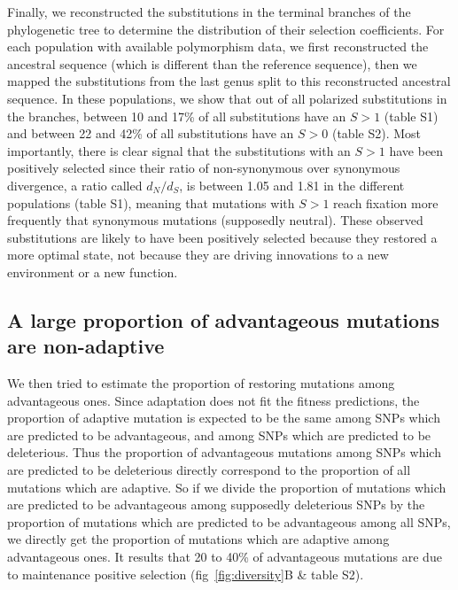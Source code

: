 \documentclass{article}
\newcommand{\dn}{d_N}
\newcommand{\ds}{d_S}
\newcommand{\dnds}{\dn / \ds}
\newcommand{\Sphy}{S}
\begin{document}
    Finally, we reconstructed the substitutions in the terminal branches of the phylogenetic tree to determine the distribution of their selection coefficients.
    For each population with available polymorphism data, we first reconstructed the ancestral sequence (which is different than the reference sequence), then we mapped the substitutions from the last genus split to this reconstructed ancestral sequence.
    In these populations, we show that out of all polarized substitutions in the branches, between 10 and 17\% of all substitutions have an $\Sphy > 1$ (table S1) and between 22 and 42\% of all substitutions have an $\Sphy > 0$ (table S2).
    Most importantly, there is clear signal that the substitutions with an $\Sphy > 1$ have been positively selected since their ratio of non-synonymous over synonymous divergence, a ratio called $\dnds$, is between 1.05 and 1.81 in the different populations (table S1), meaning that mutations with $\Sphy > 1$ reach fixation more frequently that synonymous mutations (supposedly neutral).
    These observed substitutions are likely to have been positively selected because they restored a more optimal state, not because they are driving innovations to a new environment or a new function.

    \subsection*{A large proportion of advantageous mutations are non-adaptive}

    We then tried to estimate the proportion of restoring mutations among advantageous ones.
    Since adaptation does not fit the fitness predictions, the proportion of adaptive mutation is expected to be the same among SNPs which are predicted to be advantageous, and among SNPs which are predicted to be deleterious.
    Thus the proportion of advantageous mutations among SNPs which are predicted to be deleterious directly correspond to the proportion of all mutations which are adaptive.
    So if we divide the proportion of mutations which are predicted to be advantageous among supposedly deleterious SNPs by the proportion of mutations which are predicted to be advantageous among all SNPs, we directly get the proportion of mutations which are adaptive among advantageous ones.
    It results that 20 to 40\% of advantageous mutations are due to maintenance positive selection (fig~\ref{fig:diversity}B \& table S2).
\end{document}

